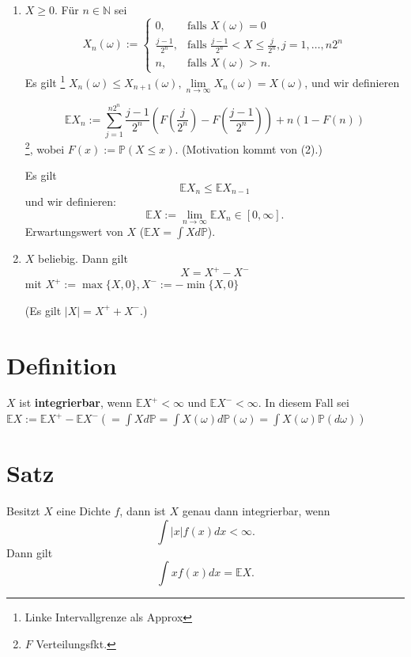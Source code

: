 \documentclass[a4paper,11pt,notitlepage]{report}
\newcommand{\N}{{\ensuremath{\mathbb{N}}}}
\newcommand{\Prim}{{\ensuremath{\mathbb{P}}}}
\newcommand{\E}{{\ensuremath{\mathbb{E}}}}
\begin{document}
\begin{enumerate}
	\item $X \geq 0$. Für $n \in \N$ sei 
	$$X_n(\omega) := \begin{cases} 0, & \text{falls } X(\omega)=0 \\ \frac{j-1}{2^n}, & \text{falls } \frac{j-1}{2^n} < X \leq \frac{j}{2^n}, j=1, \ldots, n 2^n \\
	n, & \text{falls } X(\omega) > n. \end{cases}$$
	Es gilt \footnote{Linke Intervallgrenze als Approx} $X_n(\omega) \leq X_{n+1}(\omega), \lim\limits_{n \rightarrow \infty}{X_n(\omega) = X(\omega)}$, und wir definieren
	
	$$\E X_n := \sum\limits_{j=1}^{n 2^n}{\frac{j-1}{2^n} \left(F\left(\frac{j}{2^n}\right) - F\left(\frac{j-1}{2^n}\right)\right)} + n (1-F(n))$$ \footnote{$F$ Verteilungsfkt.}, wobei $F(x):= \Prim(X \leq x)$. (Motivation kommt von (2).)
	
	Es gilt 
	$$\E X_n \leq \E X_{n-1}$$ und wir definieren:
	$$\E X := \lim\limits_{n \rightarrow \infty} \E X_n \in [0, \infty].$$
	Erwartungswert von $X$ ($\E X = \int X d \Prim$).
	
	\item $X$ beliebig. Dann gilt
	$$X = X^+ - X^-$$
	mit $X^+ := \max \{X,0\}, X^- := - \min \{X,0\}$
	
	(Es gilt $|X| = X^+ + X^-$.)
\end{enumerate}

\section{Definition}
$X$ ist \textbf{integrierbar}, wenn $\E X^+ < \infty$ und $\E X^- < \infty$. In diesem Fall sei $\E X := \E X^+ - \E X^- \left(= \int X d \Prim = \int X(\omega) d \Prim(\omega) = \int X(\omega) \Prim(d \omega)\right)$

\section{Satz}
Besitzt $X$ eine Dichte $f$, dann ist $X$ genau dann integrierbar, wenn
$$\int |x| f(x) dx < \infty.$$
Dann gilt
$$\int x f(x) dx = \E X.$$
\end{document}
